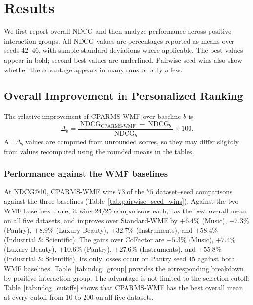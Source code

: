 \documentclass[pdflatex,sn-vancouver-num]{sn-jnl}%
\theoremstyle{thmstyleone}%
\theoremstyle{thmstyletwo}%
\theoremstyle{thmstylethree}%
\begin{document}

\section{Results}\label{sec5}

We first report overall NDCG and then analyze performance across positive interaction groups. All NDCG values are percentages reported as means over seeds $42$--$46$, with sample standard deviations where applicable. The best values appear in bold; second-best values are underlined. Pairwise seed wins also show whether the advantage appears in many runs or only a few.

\subsection{Overall Improvement in Personalized Ranking}

The relative improvement of CPARMS-WMF over baseline $b$ is
\begin{equation}
\Delta_{b}
=
\frac{
\operatorname{NDCG}_{\mathrm{CPARMS\mbox{-}WMF}}
-
\operatorname{NDCG}_{b}
}{
\operatorname{NDCG}_{b}
}
\times 100 .
\label{eq:relative_improvement}
\end{equation}
All $\Delta_b$ values are computed from unrounded scores, so they may differ slightly from values recomputed using the rounded means in the tables.

\subsubsection{Performance against the WMF baselines}

At NDCG@10, CPARMS-WMF wins $73$ of the $75$ dataset--seed comparisons against the three baselines (Table~\ref{tab:pairwise_seed_wins}). Against the two WMF baselines alone, it wins $24/25$ comparisons each, has the best overall mean on all five datasets, and improves over Standard-WMF by $+6.4\%$ (Music), $+7.3\%$ (Pantry), $+8.9\%$ (Luxury Beauty), $+32.7\%$ (Instruments), and $+58.4\%$ (Industrial \& Scientific). The gains over CoFactor are $+5.3\%$ (Music), $+7.4\%$ (Luxury Beauty), $+10.6\%$ (Pantry), $+27.6\%$ (Instruments), and $+55.8\%$ (Industrial \& Scientific). Its only losses occur on Pantry seed $45$ against both WMF baselines. Table~\ref{tab:ndcg_group} provides the corresponding breakdown by positive interaction group. The advantage is not limited to the selection cutoff: Table~\ref{tab:ndcg_cutoffs} shows that CPARMS-WMF has the best overall mean at every cutoff from $10$ to $200$ on all five datasets.
\end{document}
